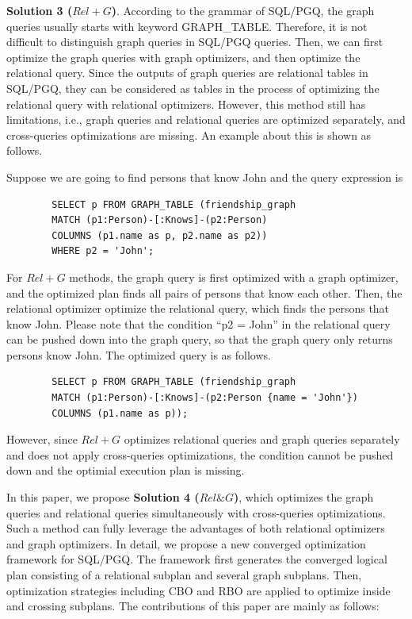 \textbf{Solution 3 ($Rel+G$)}.
According to the grammar of SQL/PGQ, the graph queries usually starts with keyword GRAPH\_TABLE.
Therefore, it is not difficult to distinguish graph queries in SQL/PGQ queries.
Then, we can first optimize the graph queries with graph optimizers, and then optimize the relational query.
Since the outputs of graph queries are relational tables in SQL/PGQ, they can be considered as tables in the process of optimizing the relational query with relational optimizers.
However, this method still has limitations, i.e., graph queries and relational queries are optimized separately, and cross-queries optimizations are missing.
An example about this is shown as follows.

\begin{example}
    Suppose we are going to find persons that know John and the query expression is
    \begin{lstlisting}
        SELECT p FROM GRAPH_TABLE (friendship_graph 
        MATCH (p1:Person)-[:Knows]-(p2:Person)
        COLUMNS (p1.name as p, p2.name as p2))
        WHERE p2 = 'John';
    \end{lstlisting}
    For $Rel+G$ methods, the graph query is first optimized with a graph optimizer, and the optimized plan finds all pairs of persons that know each other.
    Then, the relational optimizer optimize the relational query, which finds the persons that know John.
    Please note that the condition ``p2 = John'' in the relational query can be pushed down into the graph query, so that the graph query only returns persons know John.
    The optimized query is as follows.
    \begin{lstlisting}
        SELECT p FROM GRAPH_TABLE (friendship_graph 
        MATCH (p1:Person)-[:Knows]-(p2:Person {name = 'John'})
        COLUMNS (p1.name as p));
    \end{lstlisting}
    However, since $Rel+G$ optimizes relational queries and graph queries separately and does not apply cross-queries optimizations, the condition cannot be pushed down and the optimial execution plan is missing.
\end{example}

In this paper, we propose \textbf{Solution 4 ($Rel\&G$)}, which optimizes the graph queries and relational queries simultaneously with cross-queries optimizations.
Such a method can fully leverage the advantages of both relational optimizers and graph optimizers.
In detail, we propose a new converged optimization framework for SQL/PGQ.
The framework first generates the converged logical plan consisting of a relational subplan and several graph subplans.
Then, optimization strategies including CBO and RBO are applied to optimize inside and crossing subplans.
The contributions of this paper are mainly as follows:

